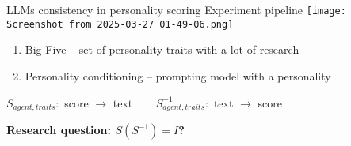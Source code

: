 \documentclass[12pt,pdf,hyperref={unicode}]{beamer}
\begin{document}
\begin{frame}{LLMs consistency in personality scoring}
Experiment pipeline
	\texttt{[image: Screenshot from 2025-03-27 01-49-06.png]}  

\begin{enumerate}[1.]
    \item Big Five -- set of personality traits with a lot of research
    \item Personality conditioning -- prompting model with a personality
\end{enumerate}

     $S_{agent, traits}:$ score $\rightarrow$ text $ \ \ \ \ \ \ \ \ $$S_{agent, traits}^{-1}:$ text $\rightarrow$ score
    
\begin{center}
\textbf{Research question: $S(S^{-1}) = I$?}
\end{center}

\end{frame}
\end{document}
